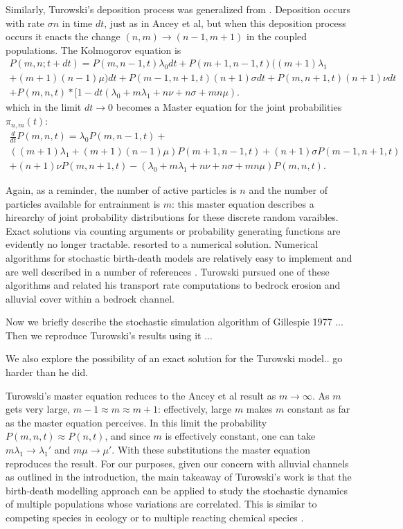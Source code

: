 Similarly, Turowski's deposition process was generalized from \citet{Ancey2008}.
Deposition occurs with rate $\sigma n$ in time $dt$, just as in Ancey et al, but when this deposition process occurs it enacts the change $(n,m) \rightarrow (n-1,m+1)$ in the coupled populations. 
The Kolmogorov equation is 
\begin{multline}
P(m,n;t+dt) = P(m,n-1,t)\lambda_0 dt + P(m+1,n-1,t)((m+1)\lambda_1 \\+ (m+1)(n-1)\mu)dt + P(m-1,n+1,t)(n+1)\sigma dt + P(m,n+1,t)(n+1)\nu dt \\+ P(m,n,t)*[1-dt(\lambda_0 + m \lambda_1 + n \nu + n \sigma + mn \mu). \end{multline}
which in the limit $dt \rightarrow 0 $ becomes a Master equation for the joint probabilities $\pi_{n,m}(t)$: 
\begin{multline} 
\frac{d}{dt} P (m,n,t) = \lambda_0 P(m,n-1,t) +\\ ((m+1)\lambda_1 + (m+1)(n-1)\mu)P(m+1,n-1,t) + (n+1)\sigma P(m-1,n+1,t)\\ + (n+1)\nu P(m,n+1,t) - (\lambda_0 + m \lambda_1 + n\nu + n \sigma + mn \mu ) P(m,n,t). 
\end{multline} 

Again, as a reminder, the number of active particles is $n$ and the number of particles available for entrainment is $m$: this master equation describes a hirearchy of joint probability distributions for these discrete random varaibles. 
Exact solutions via counting arguments \citep[e.g.][]{Ancey2006} or probability generating functions \citep[e.g.][]{Ancey2008} are evidently no longer tractable. 
\citet{Turowski2009} resorted to a numerical solution.
Numerical algorithms for stochastic birth-death models are relatively easy to implement and are well described in a number of references \citep[e.g.][]{Gillespie1977, Gillespie1992}. 
Turowski pursued one of these algorithms and related his transport rate computations to bedrock erosion and alluvial cover within a bedrock channel. 

Now we briefly describe the stochastic simulation algorithm of Gillespie 1977 ... 
Then we reproduce Turowski's results using it ... 

We also explore the possibility of an exact solution for the Turowski model.. go harder than he did. 

Turowski's master equation reduces to the Ancey et al result as $m \rightarrow \infty$. As $m$ gets very large, $m-1 \approx m \approx m+1$: effectively, large $m$ makes $m$ constant as far as the master equation perceives. 
In this limit the probability $P(m,n,t) \approx P(n,t)$, and since $m$ is effectively constant, one can take $m\lambda_1 \rightarrow \lambda_1'$ and $m\mu \rightarrow \mu'.$ 
With these substitutions the master equation reproduces the \citet{Ancey2008} result. 
For our purposes, given our concern with alluvial channels as outlined in the introduction, the main takeaway of Turowski's work is that the birth-death modelling approach can be applied to study the stochastic dynamics of multiple populations whose variations are correlated. 
This is similar to competing species in ecology \citep{Pielou1977} or to multiple reacting chemical species \citep{Gardiner1983}. 

